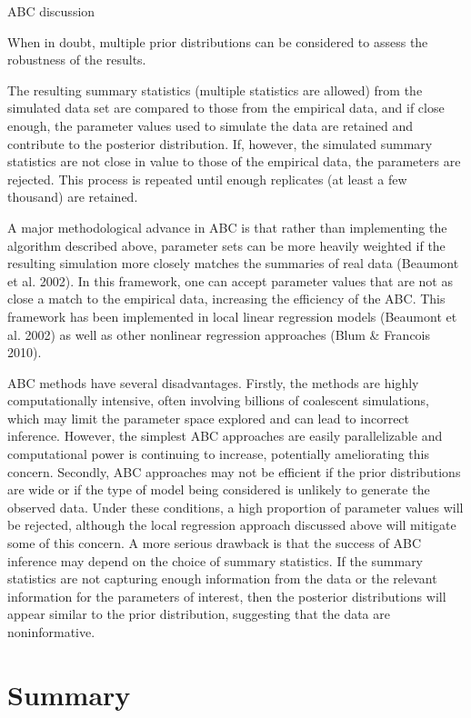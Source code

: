 ABC discussion 


When in doubt, multiple prior distributions can be considered to assess the robustness of the results. 

The resulting summary statistics (multiple statistics are allowed) from the simulated data set are compared to those from the empirical data, and if close enough, the parameter values used to simulate the data are retained and contribute to the posterior distribution. If, however, the simulated summary statistics are not close in value to those of the empirical data, the parameters are rejected. This process is repeated until enough replicates (at least a few thousand) are retained. 

A major methodological advance in ABC is that rather than implementing the algorithm described above, parameter sets can be more heavily weighted if the resulting simulation more closely matches the summaries of real data (Beaumont et al. 2002). In this framework, one can accept parameter values that are not as close a match to the empirical data, increasing the efficiency of the ABC. This framework has been implemented in local linear regression models (Beaumont et al. 2002) as well as other nonlinear regression approaches (Blum \& Francois 2010). 

ABC methods have several disadvantages. Firstly, the methods are highly computationally intensive, often involving billions of coalescent simulations, which may limit the parameter space explored and can lead to incorrect inference. However, the simplest ABC approaches are easily parallelizable and computational power is continuing to increase, potentially ameliorating this concern. Secondly, ABC approaches may not be efficient if the prior distributions are wide or if the type of model being considered is unlikely to generate the observed data. Under these conditions, a high proportion of parameter values will be rejected, although the local regression  approach discussed above will mitigate some of this concern. A more serious drawback is that the success of ABC inference may depend on the choice of summary statistics. If the summary statistics are not capturing enough information from the data or the relevant information for the parameters of interest, then the posterior distributions will appear similar to the prior distribution, suggesting that the data are noninformative. 


\section{Summary}\label{sec:summary}

